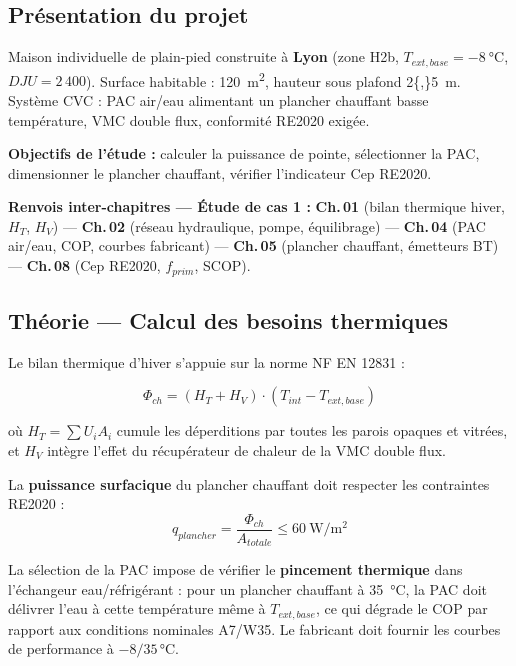 \subsection{Présentation du projet}

Maison individuelle de plain-pied construite à \textbf{Lyon} (zone H2b, $T_{ext,base} = \SI{-8}{\celsius}$,
$DJU = 2\,400$). Surface habitable : \SI{120}{\metre\squared}, hauteur sous plafond \SI{2{,}5}{\metre}.
Système CVC : PAC air/eau alimentant un plancher chauffant basse température, VMC double flux,
conformité RE2020 exigée.

\textbf{Objectifs de l'étude :} calculer la puissance de pointe, sélectionner la PAC,
dimensionner le plancher chauffant, vérifier l'indicateur Cep RE2020.

\begin{tcolorbox}[colback=FedBlue!4, colframe=FedBlue!35, boxrule=0.5pt, arc=1pt,
  top=3pt, bottom=3pt, left=6pt, right=6pt]
\footnotesize\sffamily
\textbf{Renvois inter-chapitres — Étude de cas 1 :}\quad
\textbf{Ch.\,01} (bilan thermique hiver, $H_T$, $H_V$) — \textbf{Ch.\,02} (réseau hydraulique, pompe, équilibrage) —
\textbf{Ch.\,04} (PAC air/eau, COP, courbes fabricant) — \textbf{Ch.\,05} (plancher chauffant, émetteurs BT) —
\textbf{Ch.\,08} (Cep RE2020, $f_{prim}$, SCOP).
\end{tcolorbox}

\subsection{Théorie — Calcul des besoins thermiques}

Le bilan thermique d'hiver s'appuie sur la norme NF EN 12831 :

\begin{equation}
  \Phi_{ch} = (H_T + H_V) \cdot (T_{int} - T_{ext,base})
\end{equation}

où $H_T = \sum U_i A_i$ cumule les déperditions par toutes les parois opaques et vitrées, et
$H_V$ intègre l'effet du récupérateur de chaleur de la VMC double flux.

La \textbf{puissance surfacique} du plancher chauffant doit respecter les contraintes RE2020 :
\begin{equation}
  q_{plancher} = \frac{\Phi_{ch}}{A_{totale}} \leq \SI{60}{\watt\per\metre\squared}
\end{equation}

La sélection de la PAC impose de vérifier le \textbf{pincement thermique} dans l'échangeur
eau/réfrigérant : pour un plancher chauffant à \SI{35}{\celsius}, la PAC doit délivrer
l'eau à cette température même à $T_{ext,base}$, ce qui dégrade le COP par rapport aux
conditions nominales A7/W35. Le fabricant doit fournir les courbes de performance à $-8/35\,\si{\celsius}$.

